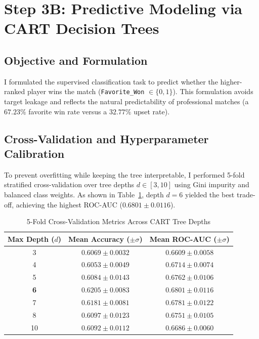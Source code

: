 \documentclass[10pt,journal]{IEEEtran}
\begin{document}
\section{Step 3B: Predictive Modeling via CART Decision Trees}

\subsection{Objective and Formulation}
I formulated the supervised classification task to predict whether the higher-ranked player wins the match (\texttt{Favorite\_Won} $\in \{0, 1\}$). This formulation avoids target leakage and reflects the natural predictability of professional matches (a $67.23\%$ favorite win rate versus a $32.77\%$ upset rate).

\subsection{Cross-Validation and Hyperparameter Calibration}
To prevent overfitting while keeping the tree interpretable, I performed 5-fold stratified cross-validation over tree depths $d \in [3, 10]$ using Gini impurity and balanced class weights. As shown in Table~\ref{tab:cv_depth}, depth $d=6$ yielded the best trade-off, achieving the highest ROC-AUC ($0.6801 \pm 0.0116$).

\begin{table}[!t]
\renewcommand{\arraystretch}{1.10}
\caption{5-Fold Cross-Validation Metrics Across CART Tree Depths}
\label{tab:cv_depth}
\centering
\footnotesize
\begin{tabular}{@{}ccc@{}}
\toprule
\textbf{Max Depth ($d$)} & \textbf{Mean Accuracy ($\pm\sigma$)} & \textbf{Mean ROC-AUC ($\pm\sigma$)} \\
\midrule
3 & $0.6069 \pm 0.0032$ & $0.6609 \pm 0.0058$ \\
4 & $0.6053 \pm 0.0049$ & $0.6714 \pm 0.0074$ \\
5 & $0.6084 \pm 0.0143$ & $0.6762 \pm 0.0106$ \\
\textbf{6} & $\mathbf{0.6205 \pm 0.0083}$ & $\mathbf{0.6801 \pm 0.0116}$ \\
7 & $0.6181 \pm 0.0081$ & $0.6781 \pm 0.0122$ \\
8 & $0.6097 \pm 0.0123$ & $0.6751 \pm 0.0105$ \\
10 & $0.6092 \pm 0.0112$ & $0.6686 \pm 0.0060$ \\
\bottomrule
\end{tabular}
\end{table}
\end{document}
